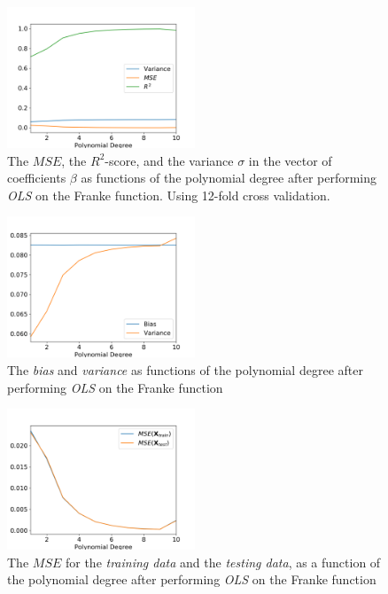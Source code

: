 \documentclass[a4paper,10pt,english]{article}
\begin{document}
\begin{figure}[H]
	\centering 
	\includegraphics[width = 0.5\textwidth, center]{../franke_output/part_B.png}
	\caption{The $MSE$, the $R^2$-score, and the variance $\sigma$ in the vector of coefficients $\beta$ as functions of the polynomial degree after performing \textit{OLS} on the Franke function.  Using 12-fold cross validation.}
	\label{fig_5}
\end{figure}

\begin{figure}[H]
	\centering 
	\includegraphics[width = 0.5\textwidth, center]{../franke_output/part_C_1.png}
	\caption{The \textit{bias} and \textit{variance} as functions of the polynomial degree after performing \textit{OLS} on the Franke function}
	\label{fig_6}
\end{figure}

\begin{figure}[H]
	\centering 
	\includegraphics[width = 0.5\textwidth, center]{../franke_output/part_C_2.png}
	\caption{The $MSE$ for the \textit{training data} and the \textit{testing data}, as a function of the polynomial degree after performing \textit{OLS} on the Franke function}
	\label{fig_7}
\end{figure}
\end{document}
